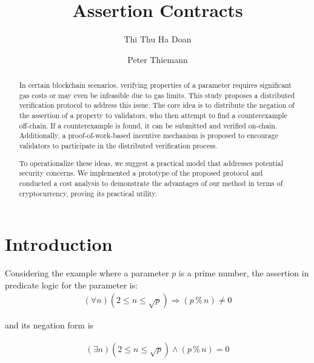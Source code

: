 \documentclass[runningheads]{llncs}
\begin{document}
%
\title{Assertion Contracts}
%
%
\author{Thi Thu Ha Doan\and Peter Thiemann}

%
%
%
\maketitle              %
%
\begin{abstract}
In certain blockchain scenarios, verifying properties of a parameter requires significant gas costs or may even be infeasible due to gas limits. This study proposes a distributed verification protocol to address this issue. The core idea is to distribute the negation of the assertion of a property to validators, who then attempt to find a counterexample off-chain. If a counterexample is found, it can be submitted and verified on-chain. Additionally, a proof-of-work-based incentive mechanism is proposed to encourage validators to participate in the distributed verification process.

To operationalize these ideas, we suggest a practical model that addresses potential security concerns. We  implemented a prototype of the proposed protocol and conducted a cost analysis to demonstrate the advantages of our method in terms of cryptocurrency, proving its practical utility.
 \keywords{}
\end{abstract}
%
%
%
\section{Introduction}
\label{sec:introduction}
Considering the example where a parameter $p$ is a prime number, the assertion in predicate logic for the parameter is:
\begin{gather}\label{eq:3a}
  (\forall n) (2 \le n \le \sqrt p) \Rightarrow (p \mathbin{\%} n) \ne 0
\end{gather}


\noindent and its negation form is 

\begin{gather}\label{eq:3b}
  (\exists n) (2 \le n \le \sqrt p) \wedge (p \mathbin{\%} n) = 0
\end{gather}
\end{document}
